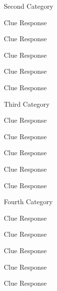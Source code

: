 \begin{category}{Second Category}
  \begin{clue}
    Clue
  \response
    Response
  \end{clue}

  \begin{clue}
    Clue
  \response
    Response
  \end{clue}

  \begin{clue}[dailydouble]
    Clue
  \response
    Response
  \end{clue}

  \begin{clue}
    Clue
  \response
    Response
  \end{clue}

  \begin{clue}
    Clue
  \response
    Response
  \end{clue}
\end{category}

\begin{category}{Third Category}
  \begin{clue}
    Clue
  \response
    Response
  \end{clue}

  \begin{clue}
    Clue
  \response
    Response
  \end{clue}

  \begin{clue}
    Clue
  \response
    Response
  \end{clue}

  \begin{clue}
    Clue
  \response
    Response
  \end{clue}

  \begin{clue}
    Clue
  \response
    Response
  \end{clue}
\end{category}

\begin{category}{Fourth Category}
  \begin{clue}
    Clue
  \response
    Response
  \end{clue}

  \begin{clue}
    Clue
  \response
    Response
  \end{clue}

  \begin{clue}
    Clue
  \response
    Response
  \end{clue}

  \begin{clue}
    Clue
  \response
    Response
  \end{clue}

  \begin{clue}
    Clue
  \response
    Response
  \end{clue}
\end{category}

